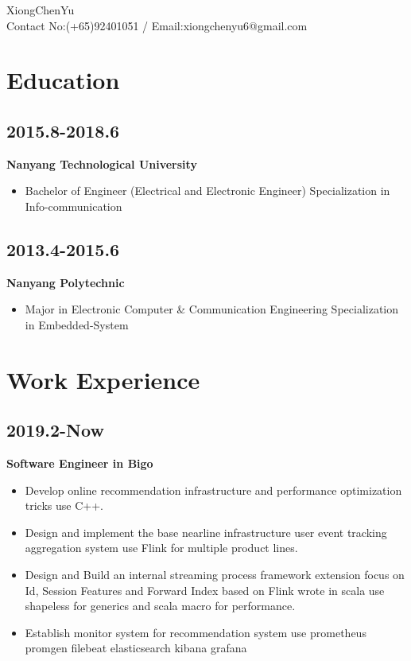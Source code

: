 \documentclass[11pt]{article}
\author{XiongChenYu}
\date{\today}
\title{}
\begin{document}
\begin{center}
XiongChenYu \\
Contact No:(+65)92401051 / Email:xiongchenyu6@gmail.com \\
\end{center}
\section{Education}
\label{sec:org75eb813}
\subsection{2015.8-2018.6}
\label{sec:orgc1cc20c}
\textbf{Nanyang Technological University}

\begin{itemize}
\item Bachelor of Engineer (Electrical and Electronic Engineer) Specialization in Info-communication
\end{itemize}
\subsection{2013.4-2015.6}
\label{sec:org1ea77c3}

\textbf{Nanyang Polytechnic}

\begin{itemize}
\item Major in Electronic Computer \& Communication Engineering Specialization in Embedded-System
\end{itemize}
\section{Work Experience}
\label{sec:org8d819af}
\subsection{2019.2-Now}
\label{sec:orga92dbe0}
\textbf{Software Engineer in Bigo}
\begin{itemize}
\item Develop online recommendation infrastructure and performance optimization tricks use C++.
\item Design and implement the base nearline infrastructure user event tracking aggregation system use Flink for multiple product lines.
\item Design and Build an internal streaming process framework extension focus on Id, Session Features and Forward Index based on Flink wrote in scala use shapeless for generics and scala macro for performance.
\item Establish monitor system for recommendation system use prometheus promgen
filebeat elasticsearch kibana grafana
\end{itemize}
\end{document}
